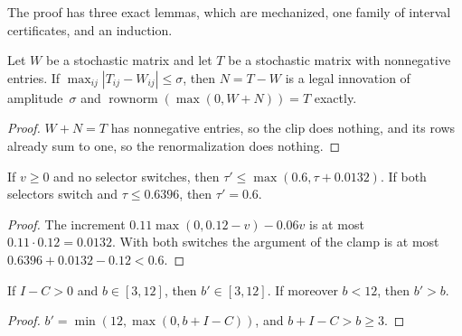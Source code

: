 The proof has three exact lemmas, which are mechanized, one family of interval certificates, and an induction.

\begin{lemma}\label{lem:target-control}
Let $W$ be a stochastic matrix and let $T$ be a stochastic matrix with nonnegative entries. If $\max_{ij}|T_{ij}-W_{ij}|\le\sigma$, then $N=T-W$ is a legal innovation of amplitude~$\sigma$ and $\operatorname{rownorm}(\max(0,W+N))=T$ exactly.
\end{lemma}

\begin{proof}
$W+N=T$ has nonnegative entries, so the clip does nothing, and its rows already sum to one, so the renormalization does nothing.
\end{proof}

\begin{lemma}[Timescale]\label{lem:timescale}
If $v\ge0$ and no selector switches, then $\tau'\le\max(0.6,\tau+0.0132)$. If both selectors switch and $\tau\le0.6396$, then $\tau'=0.6$.
\end{lemma}

\begin{proof}
The increment $0.11\max(0,0.12-v)-0.06v$ is at most $0.11\cdot0.12=0.0132$. With both switches the argument of the clamp is at most $0.6396+0.0132-0.12<0.6$.
\end{proof}

\begin{lemma}[Budget]\label{lem:budget}
If $I-C>0$ and $b\in[3,12]$, then $b'\in[3,12]$. If moreover $b<12$, then $b'>b$.
\end{lemma}

\begin{proof}
$b'=\min(12,\max(0,b+I-C))$, and $b+I-C>b\ge 3$.
\end{proof}

